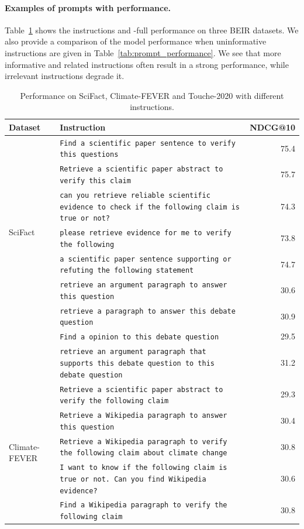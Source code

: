 \paragraph{Examples of prompts with performance.}
Table~\ref{tab:prompt_performance_full_list} shows the instructions and \model-full performance on three BEIR datasets.  
We also provide a comparison of the model performance when uninformative instructions are given in Table~\ref{tab:prompt_performance}. 
We see that more informative and related instructions often result in a strong performance, while irrelevant instructions degrade it. 

\begin{table}[t!]
\renewcommand{\arraystretch}{1.2}
\setlength{\tabcolsep}{2pt}
\footnotesize
    \centering
    \begin{tabular}{lp{9cm}r}%
\toprule
\textbf{Dataset} & \textbf{Instruction} & \textbf{NDCG@10}\\\midrule
\multirow{7}{*}{SciFact} &  \texttt{Find a scientific paper sentence to verify this questions} & 75.4 \\
 & \texttt{Retrieve a scientific paper abstract to verify this claim} & 75.7\\ 
  &\texttt{can you retrieve reliable scientific evidence to check if the following claim is true or not?} &  74.3 \\
  &  \texttt{please retrieve evidence for me to verify the following} &  73.8 \\
   &     \texttt{a scientific paper sentence supporting or refuting the following statement} &  74.7 \\
    \hline
\multirow{5}{*}{Touche-2020} &\texttt{retrieve an argument paragraph to answer this question} & 30.6 \\
&\texttt{retrieve a paragraph to answer this debate question} & 30.9 \\
&\texttt{Find a opinion to this debate question} & 29.5 \\
&\texttt{retrieve an argument paragraph that supports this debate question to this debate question} & 31.2 \\\hline
\multirow{8}{*}{Climate-FEVER} &  \texttt{Retrieve a scientific paper abstract to verify the following claim} &29.3 \\
& \texttt{Retrieve a Wikipedia paragraph to answer this question} & 30.4 \\ 
 & \texttt{Retrieve a Wikipedia paragraph to verify the following claim about climate change} &  30.8 \\
 &   \texttt{I want to know if the following claim is true or not. Can you find Wikipedia evidence?} & 30.6 \\
  &      \texttt{Find a Wikipedia paragraph to verify the following claim} & 30.8 \\
\bottomrule
 \end{tabular}
    \caption{Performance on SciFact, Climate-FEVER and Touche-2020 with different instructions. }\label{tab:prompt_performance_full_list}
\end{table}


